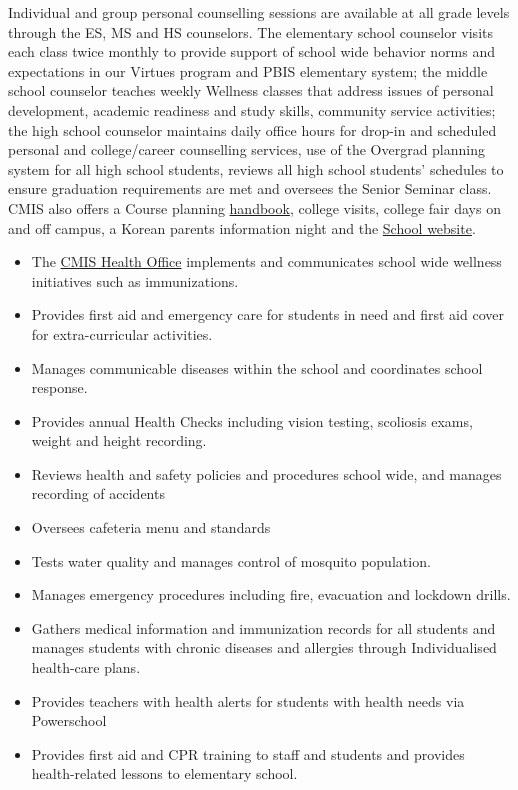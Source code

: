 \begin{findings}
Individual and group personal counselling sessions are available at all grade levels through the ES, MS and HS counselors. The elementary school counselor visits each class twice monthly to provide support of school wide behavior norms and expectations in our Virtues program and PBIS elementary system; the middle school counselor teaches weekly Wellness classes that address issues of personal development, academic readiness and study skills, community service activities; the high school counselor maintains daily office hours for drop-in and scheduled personal and college/career counselling services, use of the Overgrad planning system for all high school students, reviews all high school students’ schedules to ensure graduation requirements are met and oversees the Senior Seminar class. CMIS also offers a Course planning \href{https://docs.google.com/document/d/16eIB9M_ucfMOXqUCxWzIenWzrnKBg2kegjcK8XHlTqI/edit#heading=h.6sft8ugn206j}{handbook}, college visits, college fair days on and off campus, a Korean parents information night and the \href{http://cmis.ac.th/}{School website}.

\begin{itemize}
\item The \href{https://sites.google.com/a/cmis.ac.th/cmis-health-office/home}{CMIS Health Office} implements and communicates school wide wellness initiatives such as immunizations.
\item Provides first aid and emergency care for students in need and first aid cover for extra-curricular activities.
\item Manages communicable diseases within the school and coordinates school response. 
\item Provides annual Health Checks including vision testing, scoliosis exams, weight and height recording. 
\item Reviews health and safety policies and procedures school wide, and manages recording of accidents
\item Oversees cafeteria menu and standards 
\item Tests water quality and manages control of mosquito population. 
\item Manages emergency procedures including fire, evacuation and lockdown drills.
\item Gathers medical information and immunization records for all students and manages students with chronic diseases and allergies through Individualised health-care plans.
\item Provides teachers with health alerts for students with health needs via Powerschool
\item Provides first aid and CPR training to staff and students and provides health-related lessons to elementary school.
\end{itemize}
 

\end{findings}
